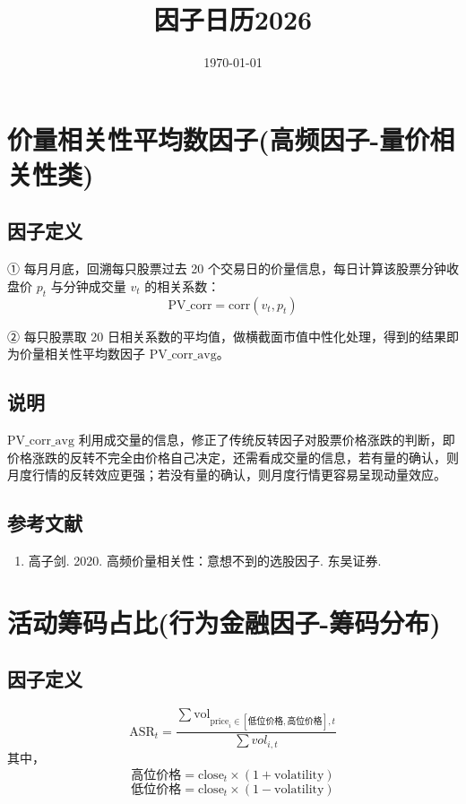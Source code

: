 \documentclass{article}
\title{因子日历2026}
\date{\today}
\begin{document}
\maketitle

\section{价量相关性平均数因子(高频因子-量价相关性类)}

\subsection{因子定义}

① 每月月底，回溯每只股票过去 20 个交易日的价量信息，每日计算该股票分钟收盘价 \( p_t \) 与分钟成交量 \( v_t \) 的相关系数：
\begin{equation}
    \mathrm{PV\_corr} = \mathrm{corr}(v_t, p_t)
\end{equation}

② 每只股票取 20 日相关系数的平均值，做横截面市值中性化处理，得到的结果即为价量相关性平均数因子 \( \mathrm{PV\_corr\_avg} \)。

\subsection{说明}
\( \mathrm{PV\_corr\_avg} \) 利用成交量的信息，修正了传统反转因子对股票价格涨跌的判断，即价格涨跌的反转不完全由价格自己决定，还需看成交量的信息，若有量的确认，则月度行情的反转效应更强；若没有量的确认，则月度行情更容易呈现动量效应。

\subsection{参考文献}
\begin{enumerate}
    \item 高子剑. 2020. 高频价量相关性：意想不到的选股因子. 东吴证券.
\end{enumerate}

\section{活动筹码占比(行为金融因子-筹码分布)}

\subsection{因子定义}
\begin{equation}
    \mathrm{ASR}_t = \frac{\sum \mathrm{vol}_{\mathrm{price}_i \in [\text{低位价格}, \text{高位价格}],t}}{\sum vol_{i,t}}
\end{equation}
其中，
\begin{equation}
    \text{高位价格} = \mathrm{close}_t \times (1 + \mathrm{volatility})
\end{equation}
\begin{equation}
    \text{低位价格} = \mathrm{close}_t \times (1 - \mathrm{volatility})
\end{equation}
\end{document}

